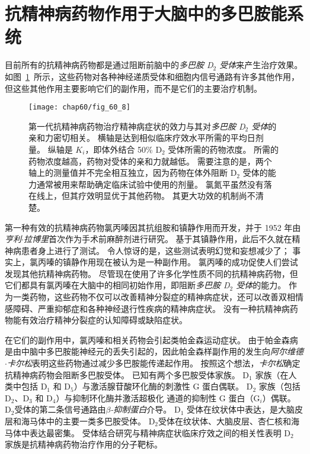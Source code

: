 \section{抗精神病药物作用于大脑中的多巴胺能系统}

目前所有的抗精神病药物都是通过阻断前脑中的\textit{多巴胺 D$_2$ 受体}来产生治疗效果。
如图~\ref{fig:60_8}~所示，这些药物对各种神经递质受体和细胞内信号通路有许多其他作用，但这些其他作用主要影响它们的副作用，而不是它们的主要治疗机制。


\begin{figure}[htbp]
	\centering
	\texttt{[image: chap60/fig\_60\_8]}
	\caption{第一代抗精神病药物治疗精神病症状的效力与其对\textit{多巴胺 D$_2$ 受体}的亲和力密切相关。
		横轴是达到相似临床疗效水平所需的平均日剂量。
		纵轴是 $ K_i $，即体外结合 50\% D$_2$ 受体所需的药物浓度。
		所需的药物浓度越高，药物对受体的亲和力就越低。
		需要注意的是，两个轴上的测量值并不完全相互独立，因为药物在体外阻断 D$_2$ 受体的能力通常被用来帮助确定临床试验中使用的剂量。
		氯氮平虽然没有落在线上，但其疗效明显优于其他药物。
		其更大功效的机制尚不清楚\cite{seeman1976antipsychotic}。}
	\label{fig:60_8}
\end{figure}


第一种有效的抗精神病药物氯丙嗪因其抗组胺和镇静作用而开发，并于 1952 年由\textit{亨利$\cdot$拉博里}首次作为手术前麻醉剂进行研究。
基于其镇静作用，此后不久就在精神病患者身上进行了测试。
令人惊讶的是，这些测试表明幻觉和妄想减少了；
事实上，氯丙嗪的镇静作用现在被认为是一种副作用。
氯丙嗪的成功促使人们尝试发现其他抗精神病药物。
尽管现在使用了许多化学性质不同的抗精神病药物，但它们都具有氯丙嗪在大脑中的相同初始作用，即阻断\textit{多巴胺 D$_2$ 受体}的能力。
作为一类药物，这些药物不仅可以改善精神分裂症的精神病症状，还可以改善双相情感障碍、严重抑郁症和各种神经退行性疾病的精神病症状。
没有一种抗精神病药物能有效治疗精神分裂症的认知障碍或缺陷症状。


在它们的副作用中，氯丙嗪和相关药物会引起类帕金森运动症状。
由于帕金森病是由中脑中多巴胺能神经元的丢失引起的，因此帕金森样副作用的发生向\textit{阿尔维德$\cdot$卡尔松}表明这些药物通过减少多巴胺能传递起作用。
按照这个想法，\textit{卡尔松}确定抗精神病药物会阻断多巴胺受体。
已知有两个多巴胺受体家族。
D$_1$ 家族（在人类中包括 D$_1$ 和 D$_5$）与激活腺苷酸环化酶的刺激性 G 蛋白偶联。
D$_2$ 家族（包括 D$_2$、D$_3$ 和 D$_4$）与抑制环化酶并激活超极化  通道的抑制性 G 蛋白（G$_i $）偶联。
D$_2$受体的第二条信号通路由\textit{$\beta$-抑制蛋白}介导。
D$_1$ 受体在纹状体中表达，是大脑皮层和海马体中的主要一类多巴胺受体。
D$_2$受体在纹状体、大脑皮层、杏仁核和海马体中表达最密集。
受体结合研究与精神病症状临床疗效之间的相关性表明 D$_2$ 家族是抗精神病药物治疗作用的分子靶标。



